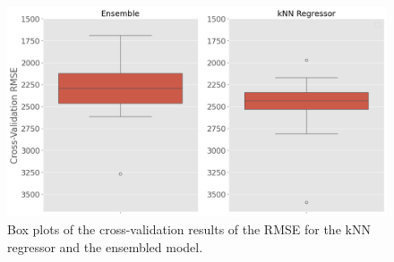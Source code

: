 \begin{figure}
    \centering
        \centering
        \includegraphics[width=\textwidth]{"content/pics/boxplots_crossval.png"}
        \caption{Box plots of the cross-validation results of the RMSE for the kNN regressor and the ensembled model.}
        \label{fig:}
\end{figure}

